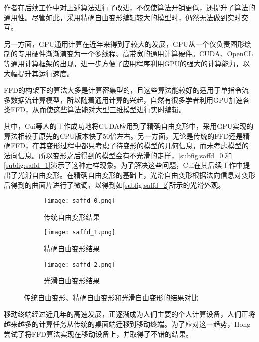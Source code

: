 作者在后续工作\cite{Feng00, Feng02}中对上述算法进行了改进，不仅使算法开销更低，还提升了算法的通用性。尽管如此，采用精确自由变形编辑较大的模型时，仍然无法做到实时交互。

另一方面，GPU通用计算在近年来得到了较大的发展，GPU从一个仅负责图形绘制的专用硬件渐渐演变为一个多线程、高带宽的通用计算硬件。CUDA、OpenCL等通用计算框架的出现，进一步方便了应用程序利用GPU的强大的计算能力，以大幅提升其运行速度。

FFD的构架下的算法大多是计算密集型的，且这些算法能较好的适用于单指令流多数据流计算模型，所以随着通用计算的兴起，自然有很多学者利用GPU加速各类FFD，从而使这些算法能对大型三维模型进行实时编辑\cite{chua2000, modat2010}。

其中，Cui等人的工作成功地将CUDA应用到了精确自由变形中\cite{Cui13, Cui14}，采用GPU实现的算法相较于原先的CPU版本快了50倍左右。另一方面，无论是传统的FFD还是精确FFD，在其变形过程中都只考虑了待变形的模型的几何信息，而未考虑模型的法向信息。所以变形之后得到的模型会有不光滑的走样，\autoref{subfig:saffd_0}和\autoref{subfig:saffd_1}演示了这种走样现象。为了解决这些问题，Cui在其后续工作中提出了光滑自由变形\cite{Cui15}。在精确自由变形的基础上，光滑自由变形根据法向信息对变形后得到的曲面片进行了微调，以得到如\autoref{subfig:saffd_2}所示的光滑外观。

\begin{figure}[htbp]
	\centering
	\begin{subfigure}[b]{.3\textwidth}
		\centering
		\texttt{[image: saffd\_0.png]}
		\caption{传统自由变形结果}\label{subfig:saffd_0}
	\end{subfigure}
	\quad
	\begin{subfigure}[b]{.3\textwidth}
		\centering
		\texttt{[image: saffd\_1.png]}
		\caption{精确自由变形结果}\label{subfig:saffd_1}
	\end{subfigure}
	\quad
	\begin{subfigure}[b]{.3\textwidth}
		\centering
		\texttt{[image: saffd\_2.png]}
		\caption{光滑自由变形结果}\label{subfig:saffd_2}
	\end{subfigure}
    \caption{传统自由变形、精确自由变形和光滑自由变形的结果对比\cite{Cui15}}\label{fig:sample_problem_saffd}
\end{figure}

移动终端经过近几年的高速发展，正逐渐成为人们主要的个人计算设备，人们正将越来越多的计算任务从传统的桌面端迁移到移动终端。为了应对这一趋势，Hong尝试了将FFD算法实现在移动设备上，并取得了不错的结果\cite{hong2013}。


